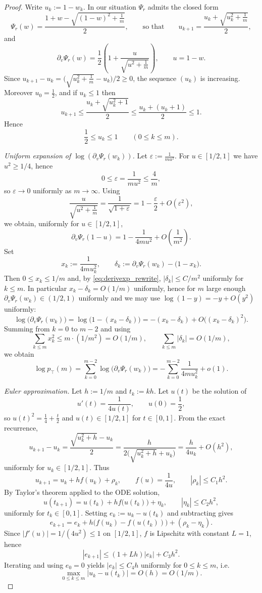 \documentclass[11pt]{article}
\newcommand{\ptop}{p_{\top}}
\begin{document}
\begin{proof}
Write \(u_k:=1-w_k\). In our situation \(\Psi_r\) admits the closed form
\[
\Psi_r(w)=\frac{1+w-\sqrt{(1-w)^2+\frac1m}}{2},
\qquad\text{so that}\qquad
u_{k+1}=\frac{u_k+\sqrt{u_k^2+\frac1m}}{2},
\]
and
\[
\partial_v\Psi_r(w)
=\frac12\left(1+\frac{u}{\sqrt{u^2+\frac1m}}\right),
\qquad u=1-w.
\]
Since \(u_{k+1}-u_k=\bigl(\sqrt{u_k^2+\frac1m}-u_k\bigr)/2\ge0\), the sequence \((u_k)\) is increasing.
Moreover \(u_0=\frac12\), and if \(u_k\le 1\) then
\[
u_{k+1}\le \frac{u_k+\sqrt{u_k^2+1}}{2}\le \frac{u_k+(u_k+1)}{2}\le 1.
\]
Hence
\[
\frac12\le u_k\le 1\qquad (0\le k\le m).
\]

\medskip
\noindent
\emph{Uniform expansion of \(\log(\partial_v\Psi_r(w_k))\).}
Let \(\varepsilon:=\frac{1}{m u^2}\). For \(u\in[1/2,1]\) we have \(u^2\ge 1/4\), hence
\[
0\le \varepsilon=\frac{1}{m u^2}\le \frac{4}{m},
\]
so \(\varepsilon\to0\) uniformly as \(m\to\infty\). Using
\[
\frac{u}{\sqrt{u^2+\frac1m}}=\frac{1}{\sqrt{1+\varepsilon}}
=1-\frac{\varepsilon}{2}+O(\varepsilon^2),
\]
we obtain, uniformly for \(u\in[1/2,1]\),
\begin{equation}
\label{eq:derivexp_rewrite}
\partial_v\Psi_r(1-u)
=1-\frac{1}{4m u^2}+O\!\left(\frac{1}{m^2}\right).
\end{equation}
Set
\[
x_k:=\frac{1}{4m u_k^2},\qquad \delta_k:=\partial_v\Psi_r(w_k)-\bigl(1-x_k\bigr).
\]
Then \(0\le x_k\le 1/m\) and, by \eqref{eq:derivexp_rewrite}, \(|\delta_k|\le C/m^2\) uniformly for \(k\le m\).
In particular \(x_k-\delta_k=O(1/m)\) uniformly, hence for \(m\) large enough \(\partial_v\Psi_r(w_k)\in(1/2,1)\)
uniformly and we may use \(\log(1-y)=-y+O(y^2)\) uniformly:
\[
\log\bigl(\partial_v\Psi_r(w_k)\bigr)
=\log\bigl(1-(x_k-\delta_k)\bigr)
=-(x_k-\delta_k)+O\bigl((x_k-\delta_k)^2\bigr).
\]
Summing from \(k=0\) to \(m-2\) and using
\[
\sum_{k\le m}x_k^2\le m\cdot (1/m^2)=O(1/m),\qquad
\sum_{k\le m}|\delta_k|=O(1/m),
\]
we obtain
\begin{equation}
\label{eq:logp1_rewrite}
\log \ptop(m)
=\sum_{k=0}^{m-2}\log\bigl(\partial_v\Psi_r(w_k)\bigr)
=-\sum_{k=0}^{m-2}\frac{1}{4m u_k^2}+o(1).
\end{equation}

\medskip
\noindent
\emph{Euler approximation.}
Let \(h:=1/m\) and \(t_k:=kh\). Let \(u(t)\) be the solution of
\[
u'(t)=\frac{1}{4u(t)},\qquad u(0)=\frac12,
\]
so \(u(t)^2=\frac14+\frac{t}{2}\) and \(u(t)\in[1/2,1]\) for \(t\in[0,1]\).
From the exact recurrence,
\[
u_{k+1}-u_k=\frac{\sqrt{u_k^2+h}-u_k}{2}
=\frac{h}{2\bigl(\sqrt{u_k^2+h}+u_k\bigr)}
=\frac{h}{4u_k}+O(h^2),
\]
uniformly for \(u_k\in[1/2,1]\). Thus
\[
u_{k+1}=u_k+h f(u_k)+\rho_k,\qquad f(u)=\frac{1}{4u},\qquad |\rho_k|\le C_1 h^2.
\]
By Taylor's theorem applied to the ODE solution,
\[
u(t_{k+1})=u(t_k)+h f\bigl(u(t_k)\bigr)+\eta_k,\qquad |\eta_k|\le C_2 h^2,
\]
uniformly for \(t_k\in[0,1]\). Setting \(e_k:=u_k-u(t_k)\) and subtracting gives
\[
e_{k+1}=e_k+h\bigl(f(u_k)-f(u(t_k))\bigr)+(\rho_k-\eta_k).
\]
Since \(|f'(u)|=1/(4u^2)\le 1\) on \([1/2,1]\), \(f\) is Lipschitz with constant \(L=1\), hence
\[
|e_{k+1}|\le (1+Lh)|e_k|+C_3 h^2.
\]
Iterating and using \(e_0=0\) yields \(|e_k|\le C_4 h\) uniformly for \(0\le k\le m\), i.e.
\[
\max_{0\le k\le m}|u_k-u(t_k)|=O(h)=O(1/m).
\]


\end{proof}
\end{document}
